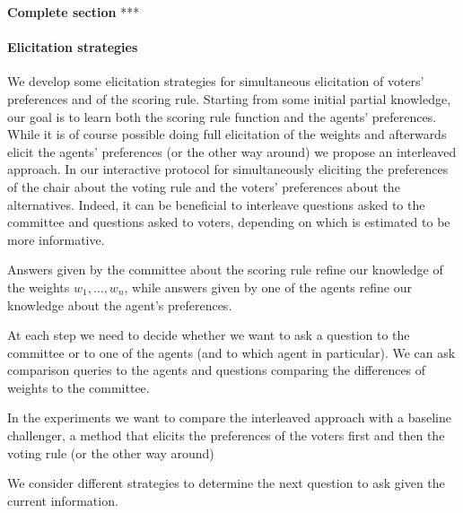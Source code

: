 \documentclass[12pt]{article}
\newcommand{\pprofile}{\textbf{p}}%
\newcommand{\w}{\textbf{w}}%
\begin{document}
\vspace{1cm}
{\bf Complete section}
\vspace{1cm}
***

\paragraph{Elicitation strategies}

We develop some elicitation strategies for simultaneous elicitation of voters' preferences and of the scoring rule.
Starting from some initial partial knowledge, our goal is to learn both the scoring rule function and the agents' preferences.
While it is of course possible doing full elicitation of the weights and afterwards elicit the agents' preferences (or the other way around) we propose an interleaved approach.
In our interactive  protocol for simultaneously eliciting the preferences of the chair about the voting rule and the voters' preferences about the alternatives.
Indeed, it can be beneficial to interleave questions asked to the committee and questions asked to voters, depending on which is estimated to be more informative.

Answers given by the committee about the scoring rule refine our knowledge of the weights $w_1,\ldots,w_n$, while
answers given by one of the agents refine our knowledge about the agent's preferences.

At each step we need to decide whether we want to ask a question to the committee or to one of the agents (and to which agent in particular). We can ask comparison queries to the agents and questions comparing the differences of weights to the committee. 

In the experiments we want to compare the interleaved approach with a baseline challenger, a method  that elicits the preferences of the voters first and then the voting rule (or the other way around)


We consider different strategies to determine the next question to ask given the current information.
\end{document}
